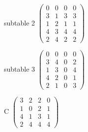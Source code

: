 \documentclass{article}
\begin{document}
   subtable 2
$\begin{pmatrix}
0&0&0&0\\
3&1&3&3\\
1&2&1&1\\
4&3&4&4\\
2&4&2&2
\end{pmatrix}$

   subtable 3
$\begin{pmatrix}
0&0&0&0\\
3&4&0&2\\
1&3&0&4\\
4&2&0&1\\
2&1&0&3
\end{pmatrix}$

  C
$\begin{pmatrix}
3&2&2&0\\
1&0&2&1\\
4&1&3&1\\
2&4&4&4
\end{pmatrix}$
\end{document}
